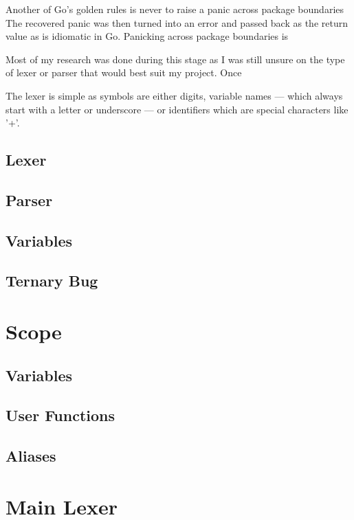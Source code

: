 Another of Go's golden rules is never to raise a panic across package boundaries
The recovered panic was then turned into an error and passed back as the return value as is idiomatic in Go.
Panicking across package boundaries is   



Most of my research was done during this stage as I was still unsure on the type of lexer or parser that would best suit my project.
Once 

The lexer is simple as symbols are either digits, variable names --- which always start with a letter or underscore --- or identifiers which are special characters like '+'.




\subsection{Lexer}


\subsection{Parser}

\subsection{Variables}
\subsection{Ternary Bug}

\section{Scope}

\subsection{Variables}
\subsection{User Functions}
\subsection{Aliases}

\section{Main Lexer}

